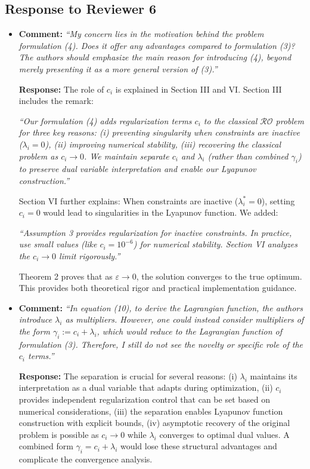 \documentclass[journal,twoside,web]{ieeecolor}
\begin{document}
\newpage
\subsection*{Response to Reviewer 6}

\begin{itemize}
\item  \textbf{Comment:} \textit{``My concern lies in the motivation behind the problem formulation (4). Does it offer any advantages compared to formulation (3)? The authors should emphasize the main reason for introducing (4), beyond merely presenting it as a more general version of (3).''}

\textbf{Response:} The role of $c_i$ is explained in Section III and VI. Section III includes the remark:

{\color{revisionblue}\textit{``Our formulation (4) adds regularization terms $c_i$ to the classical $\mathcal{RO}$ problem for three key reasons: (i) preventing singularity when constraints are inactive ($\lambda_i = 0$), (ii) improving numerical stability, (iii) recovering the classical problem as $c_i \to 0$. We maintain separate $c_i$ and $\lambda_i$ (rather than combined $\gamma_i$) to preserve dual variable interpretation and enable our Lyapunov construction.''}}

Section VI further explains: When constraints are inactive ($\lambda_i^* = 0$), setting $c_i = 0$ would lead to singularities in the Lyapunov function. We added:

{\color{revisionblue}\textit{``Assumption 3 provides regularization for inactive constraints. In practice, use small values (like $c_i = 10^{-6}$) for numerical stability. Section VI analyzes the $c_i \to 0$ limit rigorously.''}}

Theorem 2 proves that as $\varepsilon \to 0$, the solution converges to the true optimum. This provides both theoretical rigor and practical implementation guidance.

\item  \textbf{Comment:} \textit{``In equation (10), to derive the Lagrangian function, the authors introduce $\lambda_i$ as multipliers. However, one could instead consider multipliers of the form $\gamma_i := c_i + \lambda_i$, which would reduce to the Lagrangian function of formulation (3). Therefore, I still do not see the novelty or specific role of the $c_i$ terms.''}

\textbf{Response:} The separation is crucial for several reasons: (i) $\lambda_i$ maintains its interpretation as a dual variable that adapts during optimization, (ii) $c_i$ provides independent regularization control that can be set based on numerical considerations, (iii) the separation enables Lyapunov function construction with explicit bounds, (iv) asymptotic recovery of the original problem is possible as $c_i \to 0$ while $\lambda_i$ converges to optimal dual values. A combined form $\gamma_i = c_i + \lambda_i$ would lose these structural advantages and complicate the convergence analysis.


\end{itemize}
\end{document}
